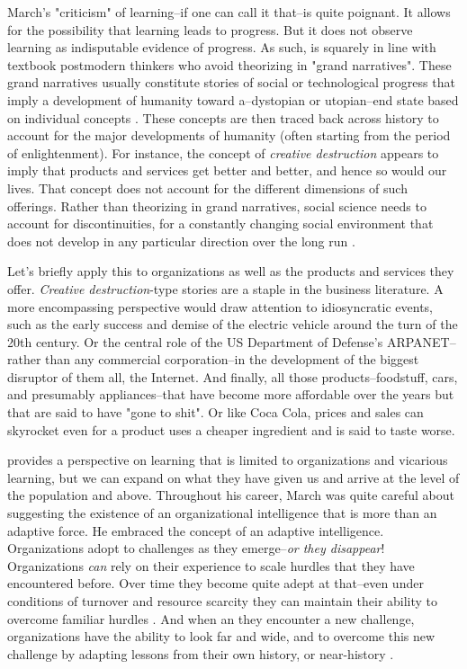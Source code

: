 \documentclass{article}
\begin{document}
	March's "criticism" of learning--if one can call it that--is quite poignant. It allows for the possibility that learning leads to progress. But it does not observe learning as indisputable evidence of progress. As such, is squarely in line with textbook postmodern thinkers who avoid theorizing in "grand narratives". These grand narratives usually constitute stories of social or technological progress that imply a development of humanity toward a--dystopian or utopian--end state based on individual concepts  \citep{Lyotard1984}. These concepts are then traced back across history to account for the major developments of humanity (often starting from the period of enlightenment). For instance, the concept of \textit{creative destruction} appears to imply that products and services get better and better, and hence so would our lives. That concept does not account for the different dimensions of such offerings. Rather than theorizing in grand narratives, social science needs to account for discontinuities, for a constantly changing social environment that does not develop in any particular direction over the long run \citep{Habermas1973}.

	Let's briefly apply this to organizations as well as the products and services they offer. \textit{Creative destruction}-type stories are a staple in the business literature. A more encompassing perspective would draw attention to idiosyncratic events, such as the early success and demise of the electric vehicle around the turn of the 20th century. Or the central role of the US Department of Defense's ARPANET--rather than any commercial corporation--in the development of the biggest disruptor of them all, the Internet. And finally, all those products--foodstuff, cars, and presumably appliances--that have become more affordable over the years but that are said to have "gone to shit". Or like Coca Cola, prices and sales can skyrocket even for a product uses a cheaper ingredient and is said to taste worse.

	\citeauthor{Levinthal1993} provides a perspective on learning that is limited to organizations and vicarious learning, but we can expand on what they have given us and arrive at the level of the population and above. Throughout his career, March was quite careful about suggesting the existence of an organizational intelligence that is more than an adaptive force. He embraced the concept of an adaptive intelligence. Organizations adopt to challenges as they emerge--\textit{or they disappear}! Organizations \textit{can} rely on their experience to scale hurdles that they have encountered before. Over time they become quite adept at that--even under conditions of turnover and resource scarcity they can maintain their ability to overcome familiar hurdles \citep{Cyert1963}. And when an they encounter a new challenge, organizations have the ability to look far and wide, and to overcome this new challenge by adapting lessons from their own history, or near-history \citep{March1991a}.
\end{document}
